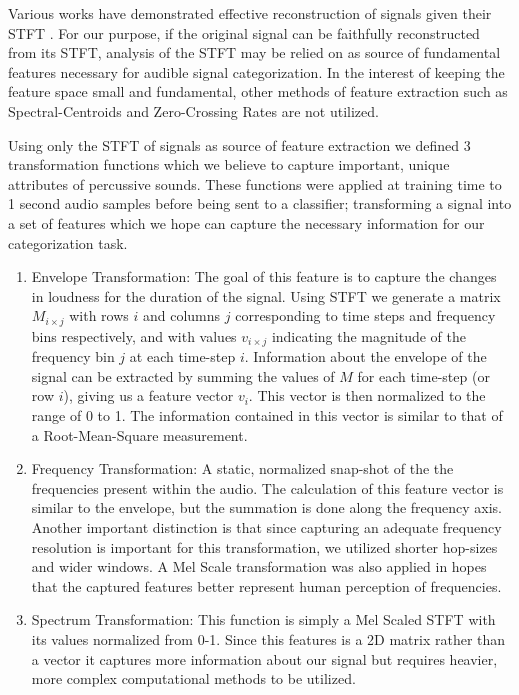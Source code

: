 \documentclass{nime-alternate} %
\begin{document}
Various works have demonstrated effective reconstruction of signals given their STFT \cite{nawab1983signal,griffin1984signal}. For our purpose, if the original signal can be faithfully reconstructed from its STFT, analysis of the STFT may be relied on as source of fundamental features necessary for audible signal categorization. In the interest of keeping the feature space small and fundamental, other methods of feature extraction such as Spectral-Centroids \cite{schubert2004spectral} and Zero-Crossing Rates \cite{gouyon2000use} are not utilized.

Using only the STFT of signals as source of feature extraction we defined 3 transformation functions which we believe to capture important, unique attributes of percussive sounds.  These functions were applied at training time to 1 second audio samples before being sent to a classifier; transforming a signal into a set of features which we hope can capture the necessary information for our categorization task. 


\begin{enumerate}
\item Envelope Transformation: The goal of this feature is to capture the changes in loudness for the duration of the signal. Using STFT we generate a matrix $M_{i \times j}$ with rows $i$ and columns $j$ corresponding to time steps and frequency bins respectively, and with values $v_{i \times j}$ indicating the magnitude of the frequency bin $j$ at each time-step $i$. Information about the envelope of the signal can be extracted by summing the values of $M$ for each time-step (or row $i$), giving us a feature vector $v_i$. This vector is then normalized to the range of 0 to 1. The information contained in this vector is similar to that of a Root-Mean-Square measurement.
\item Frequency Transformation: A static, normalized snap-shot of the the frequencies present within the audio. The calculation of this feature vector is similar to the envelope, but the summation is done along the frequency axis. Another important distinction is that since capturing an adequate frequency resolution is important for this transformation, we utilized shorter hop-sizes and wider windows. A Mel Scale transformation was also applied in hopes that the captured features better represent human perception of frequencies. 
\item Spectrum Transformation: This function is simply a Mel Scaled STFT with its values normalized from 0-1. Since this features is a 2D matrix rather than a vector it captures more information about our signal but requires heavier, more complex computational methods to be utilized. 
\end{enumerate}
\end{document}
